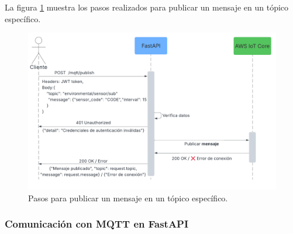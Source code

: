 La figura \ref{fig:publish_mqtt} muestra los pasos realizados para publicar un
mensaje en un tópico específico.

\begin{figure}[H]
    \centering
    \includegraphics[width=.90\textwidth]{./Images/21.png}
    \caption{Pasos para publicar un mensaje en un tópico específico.}
    \label{fig:publish_mqtt}
\end{figure}





\subsubsection{Comunicación con MQTT en FastAPI}

